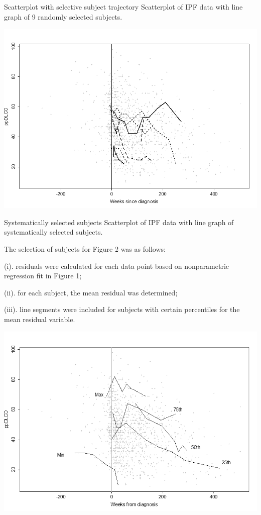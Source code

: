 \documentclass[
  9pt,
  ignorenonframetext,
]{beamer}
\begin{document}
\begin{frame}{Scatterplot with selective subject trajectory}
\protect\hypertarget{scatterplot-with-selective-subject-trajectory}{}
Scatterplot of IPF data with line graph of 9 randomly selected subjects.

\tiny

\begin{center}\includegraphics[width=0.75\linewidth]{figs_L2/L2-f6} \end{center}

\tiny
\end{frame}

\begin{frame}{Systematically selected subjects}
\protect\hypertarget{systematically-selected-subjects}{}
Scatterplot of IPF data with line graph of systematically selected
subjects.

The selection of subjects for Figure 2 was as follows:

(i). residuals were calculated for each data point based on
nonparametric regression fit in Figure 1;

(ii). for each subject, the mean residual was determined;

(iii). line segments were included for subjects with certain percentiles
for the mean residual variable. \tiny

\begin{center}\includegraphics[width=0.65\linewidth]{figs_L2/L2-f7} \end{center}

\tiny
\end{frame}
\end{document}
